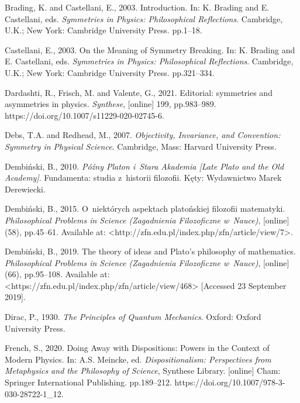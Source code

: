 Brading, K. and Castellani, E., 2003. Introduction. In: K. Brading and E. Castellani, eds. \textit{Symmetries in Physics: Philosophical Reflections}. Cambridge, U.K.; New York: Cambridge University Press. pp.1–18.



Castellani, E., 2003. On the Meaning of Symmetry Breaking. In: K. Brading and E. Castellani, eds. \textit{Symmetries in Physics: Philosophical Reflections}. Cambridge, U.K.; New York: Cambridge University Press. pp.321–334.



Dardashti, R., Frisch, M. and Valente, G., 2021. Editorial: symmetries and asymmetries in physics. \textit{Synthese}, [online] 199, pp.983–989. https://doi.org/10.1007/s11229-020-02745-6.



Debs, T.A. and Redhead, M., 2007. \textit{Objectivity, Invariance, and Convention: Symmetry in Physical Science}. Cambridge, Mass: Harvard University Press.



Dembiński, B., 2010. \textit{Późny Platon i~Stara Akademia [Late Plato and the Old Academy]}. Fundamenta: studia z~historii filozofii. Kęty: Wydawnictwo Marek Derewiecki.



Dembiński, B., 2015. O~niektórych aspektach platońskiej filozofii matematyki. \textit{Philosophical Problems in Science (Zagadnienia Filozoficzne w~Nauce)}, [online] (58), pp.45–61. Available at: {\textless}http://zfn.edu.pl/index.php/zfn/article/view/7{\textgreater}.



Dembiński, B., 2019. The theory of ideas and Plato's philosophy of mathematics. \textit{Philosophical Problems in Science (Zagadnienia Filozoficzne w~Nauce)}, [online] (66), pp.95–108. Available at: {\textless}https://zfn.edu.pl/index.php/zfn/article/view/468{\textgreater} [Accessed 23 September 2019].



Dirac, P., 1930. \textit{The Principles of Quantum Mechanics}. Oxford: Oxford University Press.



French, S., 2020. Doing Away with Dispositions: Powers in the Context of Modern Physics. In: A.S. Meincke, ed. \textit{Dispositionalism: Perspectives from Metaphysics and the Philosophy of Science}, Synthese Library. [online] Cham: Springer International Publishing. pp.189–212. https://doi.org/10.1007/978-3-030-28722-1\_12.




